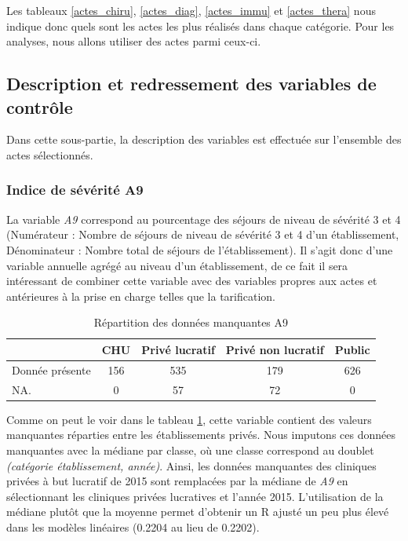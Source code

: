 \bigskip

Les tableaux \ref{actes_chiru}, \ref{actes_diag}, \ref{actes_immu} et \ref{actes_thera} nous indique donc quels sont les actes les plus réalisés dans chaque catégorie. Pour les analyses, nous allons utiliser des actes parmi ceux-ci.

\bigskip

\subsection{Description et redressement des variables de contrôle} \label{var_controle}

Dans cette sous-partie, la description des variables est effectuée sur l'ensemble des actes sélectionnés.


\subsubsection*{Indice de sévérité A9}

La variable \textit{A9} correspond au pourcentage des séjours de niveau de sévérité 3 et 4 (Numérateur : Nombre de séjours de
niveau de sévérité 3 et 4 d'un établissement, Dénominateur : Nombre total de séjours de l'établissement). Il s'agit donc d'une variable annuelle agrégé au niveau d'un établissement, de ce fait il sera intéressant de combiner cette variable avec des variables propres aux actes et antérieures à la prise en charge telles que la tarification.\\


\begin{table}[ht]
\centering
\caption{Répartition des données manquantes A9} 
\label{NA_A9}
\begin{tabular}{l|cccc}
  \hline
 & CHU & Privé lucratif & Privé non lucratif & Public \\ 
  \hline
Donnée présente & 156 & 535 & 179 & 626 \\ 
  NA. &   0 &  57 &  72 &   0 \\ 
   \hline
\end{tabular}
\end{table}



Comme on peut le voir dans le tableau \ref{NA_A9}, cette variable contient des valeurs manquantes réparties entre les établissements privés. Nous imputons ces données manquantes avec la médiane par classe, où une classe correspond au doublet \textit{(catégorie établissement, année)}. Ainsi, les données manquantes des cliniques privées à but lucratif de 2015 sont remplacées par la médiane de \textit{A9} en sélectionnant les cliniques privées lucratives et l'année 2015. L'utilisation de la médiane plutôt que la moyenne permet d'obtenir un R ajusté un peu plus élevé dans les modèles linéaires (0.2204 au lieu de 0.2202).

